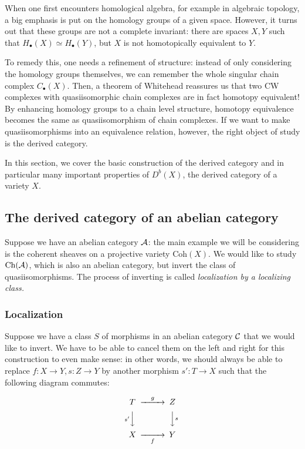 When one first encounters homological algebra, for example in algebraic topology, a big emphasis is put on the homology groups of a given space. However, it turns out that these groups are not a complete invariant: there are spaces $X,Y$ such that $H_\bullet(X) \simeq H_\bullet(Y)$, but $X$ is not homotopically equivalent to $Y$.

To remedy this, one needs a refinement of structure: instead of only considering the homology groups themselves, we can remember the whole singular chain complex $C_\bullet(X)$. Then, a theorem of Whitehead reassures us that two CW complexes with quasiisomorphic chain complexes are in fact homotopy equivalent! By enhancing homology groups to a chain level structure, homotopy equivalence becomes the same as quasiisomorphism of chain complexes. If we want to make quasiisomorphisms into an equivalence relation, however, the right object of study is the derived category.

In this section, we cover the basic construction of the derived category and in particular many important properties of $D^b(X)$, the derived category of a variety $X$.

\subsection{The derived category of an abelian category}

Suppose we have an abelian category $\mathcal{A}$: the main example we will be considering is the coherent sheaves on a projective variety $\mathrm{Coh}(X)$. We would like to study $\mathrm{Ch}(\mathcal{A})$, which is also an abelian category, but invert the class of quasiisomorphisms. The process of inverting is called \emph{localization by a localizing class.}
\subsubsection{Localization}

Suppose we have a class $S$ of morphisms in an abelian category $\mathcal{C}$ that we would like to invert. We have to be able to cancel them on the left and right for this construction to even make sense: in other words, we should always be able to replace $f:X\to Y, s:Z\to Y$ by another morphism $s':T\to X$ such that the following diagram commutes:

\begin{equation*}
    \begin{CD}
        T @>g>> Z \\
          @Vs'VV @VVsV \\
        X @>>f> Y
    \end{CD}
\end{equation*}

